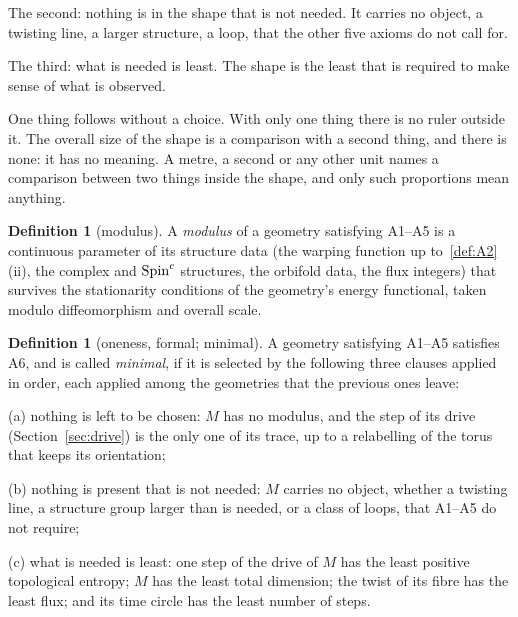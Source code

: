 \documentclass[11pt,a4paper]{article}
\theoremstyle{plain}
\theoremstyle{definition}
\newtheorem{definition}[theorem]{Definition}
\theoremstyle{remark}
\begin{document}
The second: nothing is in the shape that is not needed. It carries no object, a twisting line, a larger structure, a loop, that the other five axioms do not call for.

The third: what is needed is least. The shape is the least that is required to make sense of what is observed.

One thing follows without a choice. With only one thing there is no ruler outside it. The overall size of the shape is a comparison with a second thing, and there is none: it has no meaning. A metre, a second or any other unit names a comparison between two things inside the shape, and only such proportions mean anything.

\begin{definition}[modulus]\label{def:modulus}
A \emph{modulus} of a geometry satisfying A1--A5 is a continuous parameter of its structure data (the warping function up to~\eqref{def:A2}(ii), the complex and $\text{Spin}^c$ structures, the orbifold data, the flux integers) that survives the stationarity conditions of the geometry's energy functional, taken modulo diffeomorphism and overall scale.
\end{definition}

\begin{definition}[oneness, formal; minimal]\label{def:minimal}
A geometry satisfying A1--A5 satisfies A6, and is called \emph{minimal}, if it is selected by the following three clauses applied in order, each applied among the geometries that the previous ones leave:

(a) nothing is left to be chosen: $M$ has no modulus, and the step of its drive (Section~\ref{sec:drive}) is the only one of its trace, up to a relabelling of the torus that keeps its orientation;

(b) nothing is present that is not needed: $M$ carries no object, whether a twisting line, a structure group larger than is needed, or a class of loops, that A1--A5 do not require;

(c) what is needed is least: one step of the drive of $M$ has the least positive topological entropy; $M$ has the least total dimension; the twist of its fibre has the least flux; and its time circle has the least number of steps.
\end{definition}
\end{document}
